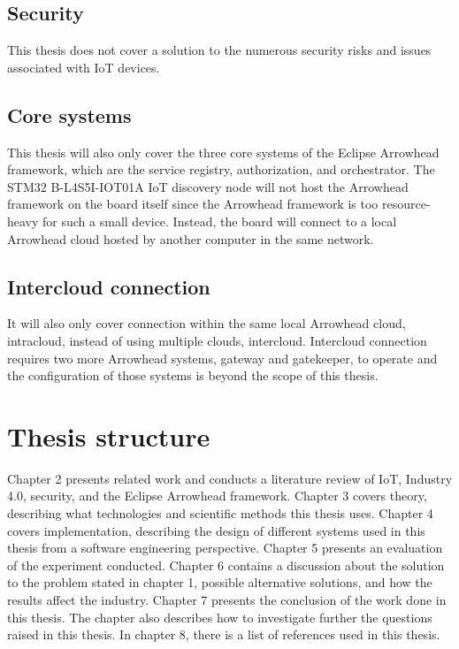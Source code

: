 \subsection{Security}
This thesis does not cover a solution to the numerous security risks and issues associated with IoT devices. 
\subsection{Core systems}
This thesis will also only cover the three core systems of the Eclipse Arrowhead framework, which are the service registry, authorization, and orchestrator. 
The STM32 B-L4S5I-IOT01A IoT discovery node will not host the Arrowhead framework on the board itself since the Arrowhead framework is too resource-heavy for such a small device.
Instead, the board will connect to a local Arrowhead cloud hosted by another computer in the same network. 
\subsection{Intercloud connection}
It will also only cover connection within the same local Arrowhead cloud, intracloud, instead of using multiple clouds, intercloud.
Intercloud connection requires two more Arrowhead systems, gateway and gatekeeper, to operate and the configuration of those systems is beyond the scope of this thesis.
\section{Thesis structure}
Chapter 2 presents related work and conducts a literature review of IoT, Industry 4.0, security, and the Eclipse Arrowhead framework.
Chapter 3 covers theory, describing what technologies and scientific methods this thesis uses.
Chapter 4 covers implementation, describing the design of different systems used in this thesis from a software engineering perspective.
Chapter 5 presents an evaluation of the experiment conducted.
Chapter 6 contains a discussion about the solution to the problem stated in chapter 1, possible alternative solutions, and how the results affect the industry.
Chapter 7 presents the conclusion of the work done in this thesis. The chapter also describes how to investigate further the questions raised in this thesis. 
In chapter 8, there is a list of references used in this thesis.
